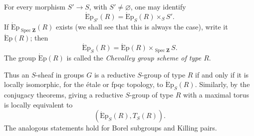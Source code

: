 For every morphism \(S'\to S\), with \(S'\ne\varnothing\), one may
identify
\[
  \operatorname{\acute Ep}_{S'}(R)
    =\operatorname{\acute Ep}_S(R)\times_SS'.
\]
If \(\operatorname{\acute Ep}_{\operatorname{Spec}\mathbf Z}(R)\)
exists (we shall see that this is always the case), write it \(\operatorname{\acute Ep}(R)\); then
\[
  \operatorname{\acute Ep}_S(R)
    =\operatorname{\acute Ep}(R)
      \times_{\operatorname{Spec}\mathbf Z}S.
\]
The group \(\operatorname{\acute Ep}(R)\) is called the
\emph{Chevalley group scheme of type \(R\)}.

Thus an \(S\)-sheaf in groups \(G\) is a reductive \(S\)-group of
type \(R\) if and only if it is locally isomorphic, for the étale or
fpqc topology, to \(\operatorname{\acute Ep}_S(R)\). Similarly, by
the conjugacy theorems, giving a reductive \(S\)-group of type \(R\)
with a maximal torus is locally equivalent to
\[
  (\operatorname{\acute Ep}_S(R),T_S(R)).
\]
The analogous statements hold for Borel subgroups and Killing pairs.
